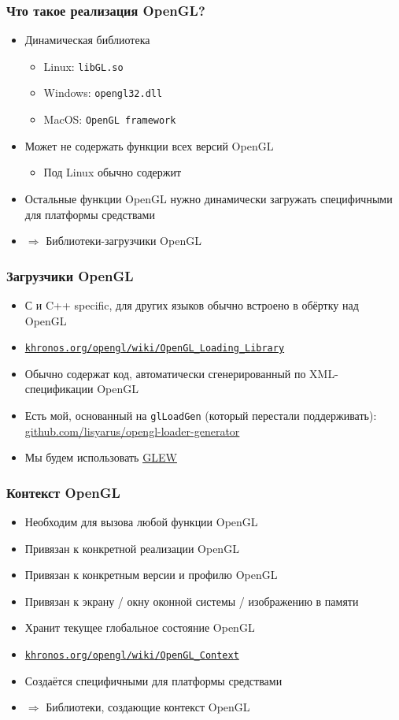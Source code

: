 \documentclass{beamer}
\begin{document}
\begin{frame}[fragile]
\frametitle{Что такое реализация OpenGL?}
\begin{itemize}
\item Динамическая библиотека
\begin{itemize}
\item Linux: \verb|libGL.so|
\item Windows: \verb|opengl32.dll|
\item MacOS: \verb|OpenGL framework|
\end{itemize}
\pause
\item Может не содержать функции всех версий OpenGL
\begin{itemize}
\item Под Linux обычно содержит
\end{itemize}
\item Остальные функции OpenGL нужно динамически загружать специфичными для платформы средствами
\item $\Longrightarrow$ Библиотеки-загрузчики OpenGL
\end{itemize}
\end{frame}

\begin{frame}[fragile]
\frametitle{Загрузчики OpenGL}
\begin{itemize}
\item С и C++ specific, для других языков обычно встроено в обёртку над OpenGL
\item \href{https://khronos.org/opengl/wiki/OpenGL_Loading_Library}{\nolinkurl{khronos.org/opengl/wiki/OpenGL\_Loading\_Library}}
\item Обычно содержат код, автоматически сгенерированный по XML-спецификации OpenGL
\item Есть мой, основанный на \verb|glLoadGen| (который перестали поддерживать): \href{https://github.com/lisyarus/opengl-loader-generator}{github.com/lisyarus/opengl-loader-generator}
\item Мы будем использовать \href{http://glew.sourceforge.net/}{\color{blue}\underline{GLEW}}
\end{itemize}
\end{frame}

\begin{frame}
\frametitle{Контекст OpenGL}
\begin{itemize}
\item Необходим для вызова любой функции OpenGL
\item Привязан к конкретной реализации OpenGL
\item Привязан к конкретным версии и профилю OpenGL
\item Привязан к экрану / окну оконной системы / изображению в памяти
\item Хранит текущее глобальное состояние OpenGL
\item \href{https://khronos.org/opengl/wiki/OpenGL_Context}{\nolinkurl{khronos.org/opengl/wiki/OpenGL\_Context}}
\item Создаётся специфичными для платформы средствами
\item $\Longrightarrow$ Библиотеки, создающие контекст OpenGL
\end{itemize}
\end{frame}
\end{document}
